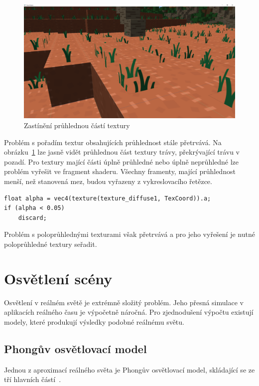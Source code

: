 \documentclass[thesis=M,czech]{FITthesis}[2019/12/23]
\begin{document}
\begin{figure}\centering
	\includegraphics[width=\textwidth]{images/alpha_cut_off}
	\caption[Zastínění průhlednou částí textury]{Zastínění průhlednou částí textury}\label{fig:alpha_cut_off}
\end{figure}

Problém s pořadím textur obsahujících průhlednost stále přetrvává. Na obrázku~\ref{fig:alpha_cut_off} lze jasně vidět průhlednou část textury trávy, překrývající trávu v pozadí. Pro textury mající části úplně průhledné nebo úplně neprůhledné lze problém vyřešit ve fragment shaderu. Všechny framenty, mající průhlednost menší, než stanovená mez, budou vyřazeny z vykreslovacího řetězce.

\begin{verbatim}
float alpha = vec4(texture(texture_diffuse1, TexCoord)).a;
if (alpha < 0.05)
    discard;
\end{verbatim}

Problém s poloprůhlednými texturami však přetrvává a pro jeho vyřešení je nutné poloprůhledné textury seřadit.

\section{Osvětlení scény}

Osvětlení v reálném světě je extrémně složitý problém. Jeho přesná simulace v aplikacích reálného času je výpočetně náročná. Pro zjednodušení výpočtu existují modely, které produkují výsledky podobné reálnému světu.

\subsection{Phongův osvětlovací model}

Jednou z aproximací reálného světa je Phongův osvětlovací model, skládající se ze tří hlavních částí~\cite{lopgl_basic_light}.
\end{document}
